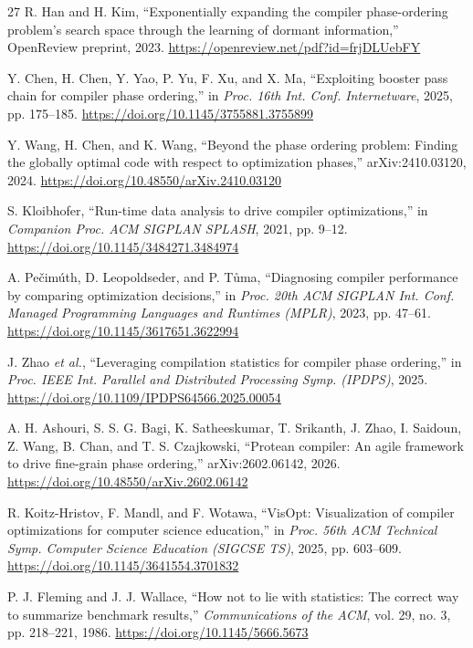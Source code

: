\documentclass[conference,a4paper]{IEEEtran}
\begin{document}
\begin{thebibliography}{27}
R. Han and H. Kim,
``Exponentially expanding the compiler phase-ordering problem's search space through the learning of dormant information,'' OpenReview preprint, 2023.
\url{https://openreview.net/pdf?id=frjDLUebFY}

Y. Chen, H. Chen, Y. Yao, P. Yu, F. Xu, and X. Ma,
``Exploiting booster pass chain for compiler phase ordering,''
in \textit{Proc. 16th Int. Conf. Internetware}, 2025, pp. 175--185.
\url{https://doi.org/10.1145/3755881.3755899}

Y. Wang, H. Chen, and K. Wang,
``Beyond the phase ordering problem: Finding the globally optimal code with respect to optimization phases,'' arXiv:2410.03120, 2024.
\url{https://doi.org/10.48550/arXiv.2410.03120}

S. Kloibhofer,
``Run-time data analysis to drive compiler optimizations,''
in \textit{Companion Proc. ACM SIGPLAN SPLASH}, 2021, pp. 9--12.
\url{https://doi.org/10.1145/3484271.3484974}

A. Pe\v{c}im\'{u}th, D. Leopoldseder, and P. T\r{u}ma,
``Diagnosing compiler performance by comparing optimization decisions,''
in \textit{Proc. 20th ACM SIGPLAN Int. Conf. Managed Programming Languages and Runtimes (MPLR)}, 2023, pp. 47--61.
\url{https://doi.org/10.1145/3617651.3622994}

J. Zhao \textit{et al.},
``Leveraging compilation statistics for compiler phase ordering,''
in \textit{Proc. IEEE Int. Parallel and Distributed Processing Symp. (IPDPS)}, 2025.
\url{https://doi.org/10.1109/IPDPS64566.2025.00054}

A. H. Ashouri, S. S. G. Bagi, K. Satheeskumar, T. Srikanth, J. Zhao, I. Saidoun, Z. Wang, B. Chan, and T. S. Czajkowski,
``Protean compiler: An agile framework to drive fine-grain phase ordering,'' arXiv:2602.06142, 2026.
\url{https://doi.org/10.48550/arXiv.2602.06142}

R. Koitz-Hristov, F. Mandl, and F. Wotawa,
``VisOpt: Visualization of compiler optimizations for computer science education,''
in \textit{Proc. 56th ACM Technical Symp. Computer Science Education (SIGCSE TS)}, 2025, pp. 603--609.
\url{https://doi.org/10.1145/3641554.3701832}

P. J. Fleming and J. J. Wallace,
``How not to lie with statistics: The correct way to summarize benchmark results,''
\textit{Communications of the ACM}, vol. 29, no. 3, pp. 218--221, 1986.
\url{https://doi.org/10.1145/5666.5673}

\end{thebibliography}
\end{document}
